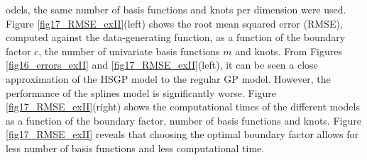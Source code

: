 \documentclass[]{interact}
\theoremstyle{plain}%
\theoremstyle{definition}
\theoremstyle{remark}
\begin{document}
odels, the same number of basis functions and knots per dimension were used. Figure \ref{fig17_RMSE_exII}(left) shows the root mean squared error (RMSE), computed against the data-generating function, as a function of the boundary factor $c$, the number of univariate basis functions $m$ and knots. From Figures \ref{fig16_errors_exII} and \ref{fig17_RMSE_exII}(left), it can be seen a close approximation of the HSGP model to the regular GP model. However, the performance of the splines model is significantly worse. Figure \ref{fig17_RMSE_exII}(right) shows the computational times of the different models as a function of the boundary factor, number of basis functions and knots. Figure \ref{fig17_RMSE_exII} reveals that choosing the optimal boundary factor allows for less number of basis functions and less computational time.
\end{document}
